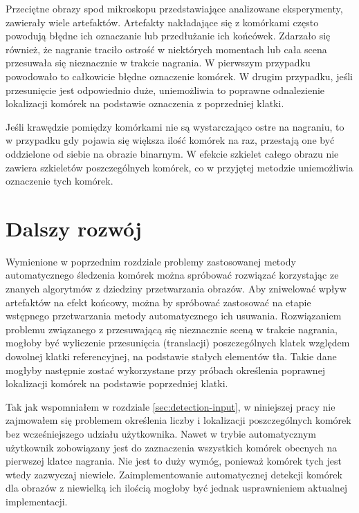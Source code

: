 \documentclass[declaration,shortabstract,mgr]{iithesis}
\begin{document}
Przeciętne obrazy spod mikroskopu przedstawiające analizowane eksperymenty, zawierały wiele artefaktów.
Artefakty nakładające się z komórkami często powodują błędne ich oznaczanie lub przedłużanie ich końcówek.
Zdarzało się również, że nagranie traciło ostrość w niektórych momentach lub cała scena przesuwała się nieznacznie w trakcie nagrania.
W pierwszym przypadku powodowało to całkowicie błędne oznaczenie komórek.
W drugim przypadku, jeśli przesunięcie jest odpowiednio duże, uniemożliwia to poprawne odnalezienie lokalizacji komórek na podstawie oznaczenia z poprzedniej klatki.

Jeśli krawędzie pomiędzy komórkami nie są wystarczająco ostre na nagraniu, to w przypadku gdy pojawia się większa ilość komórek na raz, przestają one być oddzielone od siebie na obrazie binarnym.
W efekcie szkielet całego obrazu nie zawiera szkieletów poszczególnych komórek, co w przyjętej metodzie uniemożliwia oznaczenie tych komórek.

\section{Dalszy rozwój}

Wymienione w poprzednim rozdziale problemy zastosowanej metody automatycznego śledzenia komórek można spróbować rozwiązać korzystając ze znanych algorytmów z dziedziny przetwarzania obrazów.
Aby zniwelować wpływ artefaktów na efekt końcowy, można by spróbować zastosować na etapie wstępnego przetwarzania metody automatycznego ich usuwania\cite{paper:removing-artifacts}.
Rozwiązaniem problemu związanego z przesuwającą się nieznacznie sceną w trakcie nagrania, mogłoby być wyliczenie przesunięcia (translacji) poszczególnych klatek względem dowolnej klatki referencyjnej, na podstawie stałych elementów tła.
Takie dane mogłyby następnie zostać wykorzystane przy próbach określenia poprawnej lokalizacji komórek na podstawie poprzedniej klatki.

Tak jak wspomniałem w rozdziale \ref{sec:detection-input}, w niniejszej pracy nie zajmowałem się problemem określenia liczby i lokalizacji poszczególnych komórek bez wcześniejszego udziału użytkownika.
Nawet w trybie automatycznym użytkownik zobowiązany jest do zaznaczenia wszystkich komórek obecnych na pierwszej klatce nagrania.
Nie jest to duży wymóg, ponieważ komórek tych jest wtedy zazwyczaj niewiele.
Zaimplementowanie automatycznej detekcji komórek dla obrazów z niewielką ich ilością mogłoby być jednak usprawnieniem aktualnej implementacji.
\end{document}
